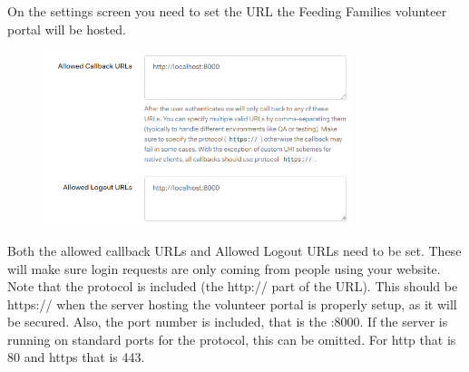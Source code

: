 \documentclass[12pt]{article}
\begin{document}
\noindent
On the settings screen you need to set the URL the Feeding Families volunteer portal will be hosted.
\begin{figure}[H]
    \centering
    \includegraphics[width=0.8\textwidth]{auth0/urls.png}
\end{figure}
\noindent
Both the allowed callback URLs and Allowed Logout URLs need to be set. These will make sure login requests are only coming from people using your website. Note that the protocol is included (the http:// part of the URL). This should be https:// when the server hosting the volunteer portal is properly setup, as it will be secured. Also, the port number is included, that is the :8000. If the server is running on standard ports for the protocol, this can be omitted. For http that is 80 and https that is 443.\\
\end{document}
